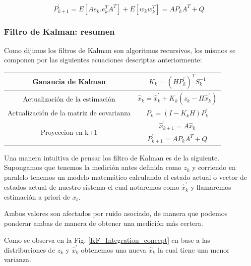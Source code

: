 \documentclass[10pt,a4paper]{article}
\begin{document}
\begin{equation}
    P^\prime_{k+1} = E[A e_{k}.e_{k}^{T}A^{T}]+ E[w_k w_k^{T}]= A P_k A^{T} + Q
    \label{projection_p_k}
\end{equation}	

\subsubsection{Filtro de Kalman: resumen}

Como dijimos los filtros de Kalman son algoritmos recursivos, los mismos se
componen por las siguientes ecuaciones descriptas anteriormente:

\begin{table}[h!]
    \centering
    \begin{tabular}{|c|c|}
	\hline
	\rule{0pt}{4ex}	Ganancia de Kalman 							& $K_k = (H P^\prime_k)^T S_k^{-1}$  \\ \hline
	\rule{0pt}{4ex}	Actualización de la estimación			    &  $\hat{x}_k = \hat{x}^\prime_k + K_k (z_k - H\hat{x}^\prime_k)$\\ \hline
	\rule{0pt}{4ex}	Actualización de la matriz de covarianza    & $P_k = (I - K_k H) P^\prime_k$ \\ \hline
	\multirow{2}{*}{Proyeccion en k+1}        		  			& \rule{0pt}{4ex} $\hat{x}^\prime_{k+1} = A \hat{x}_k$ \\ \cline{2-2}
	& \rule{0pt}{4ex} $P^\prime_{k+1} = A P_k A^{T} + Q$ \\ \hline
    \end{tabular}
    \label{Ecuaciones_Kalman}
\end{table}

Una manera intuitiva de pensar los filtro de Kalman es de la siguiente.
Supongamos que tenemos la medición antes definida como $z_k$ y corriendo en
paralelo tenemos un modelo matemático calculando el estado actual o vector de
estados actual de nuestro sistema el cual notaremos como $\hat{x}^\prime_k$ y
llamaremos estimación a priori de $x_{t}$.

Ambos valores son afectados por ruido asociado, de manera que podemos ponderar
ambas de manera de obtener una medición más certera.

Como se observa en la Fig. \ref{KF_Integration_concept} en base a las
distribuciones de $z_k$ y $\hat{x}^\prime_k$ obtenemos una nueva $\hat{x}_k$ la
cual tiene una menor varianza.
\end{document}
